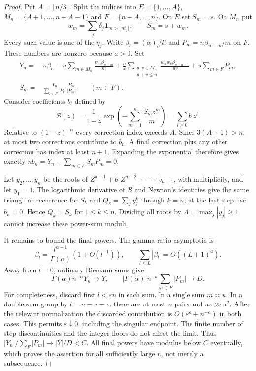 \documentclass[11pt]{amsart}
\begin{document}
\begin{proof}
Put $A=\lfloor n/3\rfloor$. Split the indices into
$E=\{1,\ldots,A\}$, $M_n=\{A+1,\ldots,n-A-1\}$ and
$F=\{n-A,\ldots,n\}$. On $E$ set $S_m=s$. On $M_n$ put
\[
 w_m=\sum_j\delta_j\mathbf1_{m>\lfloor nt_j\rfloor},
 \qquad S_m=s+w_m.
\]
Every such value is one of the $\eta_j$. Write
$\beta_l=(\alpha)_l/l!$ and $P_m=n\beta_{n-m}/m$ on $F$.
These numbers are nonzero because $a>0$. Set
\begin{align*}
 Y_n={}&n\beta_n-n\sum_{m\in M_n}\frac{w_m\beta_{n-m}}m
 +\frac n2\sum_{\substack{u,v\in M_n\\u+v\le n}}
       \frac{w_uw_v\beta_{n-u-v}}{uv}+s\sum_{m\in F}P_m,\\
 S_m={}&\frac{Y_n}{\sum_{r\in F}|P_r|}
              \frac{\overline{P_m}}{|P_m|}\qquad(m\in F).
\end{align*}
Consider coefficients $b_l$ defined by
\[
 \mathcal B(z)=\frac1{1-z}
     \exp\left(-\sum_{m=1}^n\frac{S_mz^m}{m}\right)
       =\sum_{l\ge0}b_lz^l.
\]
Relative to $(1-z)^{-\alpha}$ every correction index exceeds $A$.
Since $3(A+1)>n$, at most two corrections contribute to $b_n$.
A final correction plus any other correction has index at least $n+1$.
Expanding the exponential therefore gives exactly
$nb_n=Y_n-\sum_{m\in F}S_mP_m=0$.

Let $y_2,\ldots,y_n$ be the roots of
$Z^{n-1}+b_1Z^{n-2}+\cdots+b_{n-1}$, with multiplicity, and let $y_1=1$.
The logarithmic derivative of $\mathcal B$ and Newton's identities
give the same triangular recurrence for $S_k$ and
$Q_k=\sum_j y_j^k$ through $k=n$; at the last step use $b_n=0$.
Hence $Q_k=S_k$ for $1\le k\le n$. Dividing all roots by
$\Lambda=\max_j|y_j|\ge1$ cannot increase these power-sum moduli.

It remains to bound the final powers. The gamma-ratio asymptotic is
\[
 \beta_l=\frac{l^{\alpha-1}}{\Gamma(\alpha)}(1+O(l^{-1})),
 \qquad \sum_{l\le L}|\beta_l|=O((L+1)^a).
\]
Away from $l=0$, ordinary Riemann sums give
\[
 \Gamma(\alpha)n^{-\alpha}Y_n\longrightarrow Y,
 \qquad |\Gamma(\alpha)|n^{-a}\sum_{m\in F}|P_m|
          \longrightarrow D.
\]
For completeness, discard first $l<\varepsilon n$ in each sum.
In a single sum $m\asymp n$. In a double sum group by
$l=n-u-v$: there are at most $n$ pairs and $uv\gg n^2$.
After the relevant normalization the discarded contribution is
$O(\varepsilon^a+n^{-a})$ in both cases. This permits
$\varepsilon\downarrow0$, including the singular endpoint.
The finite number of step discontinuities and the integer floors do
not affect the limit. Thus
$|Y_n|/\sum_F|P_m|\to|Y|/D<C$. All final powers have modulus below
$C$ eventually, which proves the assertion for all sufficiently large
$n$, not merely a subsequence.
\end{proof}
\end{document}
